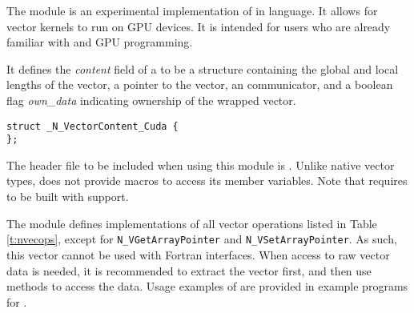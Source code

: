 %
The {\nveccuda} module is an experimental implementation of {\nvector} in {\cuda} language. 
It allows for {\sundials} vector kernels to run on GPU devices. It is intended for users 
who are already familiar with {\cuda} and GPU programming. 


It defines the {\em content} field of a  to be a structure containing
the global and local lengths of the vector, a pointer to the {\cuda} vector,
an {\mpi} communicator, and a boolean flag {\em own\_data} indicating ownership of 
the wrapped {\cuda} vector.
\begin{verbatim} 
struct _N_VectorContent_Cuda {
};
\end{verbatim}

The header file to be included when using this module is .
Unlike native {\sundials} vector types, {\nveccuda} does not provide macros 
to access its member variables.
Note that {\nveccuda} requires {\sundials} to be built with {\mpi} support.


The {\nveccuda} module defines implementations of all vector operations listed 
in Table \ref{t:nvecops}, except for \verb|N_VGetArrayPointer| and 
\verb|N_VSetArrayPointer|. As such, this vector cannot be used with {\sundials} Fortran interfaces.
When access to raw vector data is needed, it is 
recommended to extract the {\cuda} vector first, and then use {\cuda} 
methods to access the data. Usage examples of {\nveccuda} are provided in 
example programs for {\cvode} \cite{cvode_ex}.

